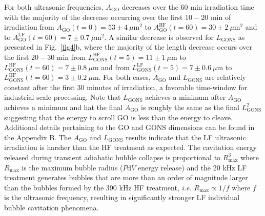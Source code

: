 For both ultrasonic frequencies, $A_{\mathrm{GO}}$ decreases over the 60 min irradiation time with the majority of the decrease occurring over the first $10-20$ min of irradiation from $A_{\mathrm{GO}}(t = 0) = 53 \pm 4\ \mu$m$^{2}$ to $A_{\mathrm{GO}}^{\mathrm{HF}}(t = 60) = 30 \pm 2\ \mu$m$^{2}$ and to $A_{\mathrm{GO}}^{\mathrm{LF}}(t = 60) = 7 \pm 0.7\ \mu$m$^{2}$. A similar decrease is observed for $L_{\mathrm{GONS}}$ as presented in Fig.~\ref{fig4}b, where the majority of the length decrease occurs over the first $20-30$ min from $L_{\mathrm{GONS}}^{\mathrm{HF}}(t = 5) = 11 \pm 1\ \mu$m to $L_{\mathrm{GONS}}^{\mathrm{HF}}(t = 60) = 7 \pm 0.8\ \mu$m and from $L_{\mathrm{GONS}}^{\mathrm{LF}}(t = 5) = 7 \pm 0.6\ \mu$m to $L_{\mathrm{GONS}}^{\mathrm{HF}}(t = 60) = 3 \pm 0.2\ \mu$m. For both cases, $A_{\mathrm{GO}}$ and $L_{\mathrm{GONS}}$ are relatively constant after the first 30 minutes of irradiation, a favorable time-window for industrial-scale processing. Note that $L_{\mathrm{GONS}}$ achieves a minimum after $A_{\mathrm{GO}}$ achieves a minimum and hat the final $A_{\mathrm{GO}}$ is roughly the same as the final $L_{\mathrm{GONS}}^{2}$ suggesting that the energy to scroll GO is less than the energy to cleave. Additional details pertaining to the GO and GONS dimensions can be found in the Appendix B. The $A_{\mathrm{GO}}$ and $L_{\mathrm{GONS}}$ results indicate that the LF ultrasonic irradiation is harsher than the HF treatment as expected. The cavitation energy released during transient adiabatic bubble collapse is proportional to $R_{\mathrm{max}}^{3}$ where $R_{\mathrm{max}}$ is the maximum bubble radius ($P$d$V$ energy release)\cite{Tinguely2012} and the 20 kHz LF treatment generates bubbles that are more than an order of magnitude larger than the bubbles formed by the 390 kHz HF treatment\cite{Brotchie2009,Merouani2013}, \textit{i.e.} $R_{\mathrm{max}} \propto 1/f$ where $f$ is the ultrasonic frequency, resulting in significantly stronger LF individual bubble cavitation phenomena.

